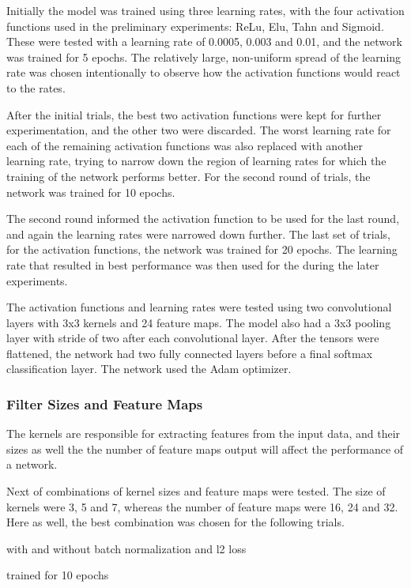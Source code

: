\documentclass[]{article}
\begin{document}
Initially the model was trained using three learning rates, with the four activation functions used in the preliminary experiments: ReLu, Elu, Tahn and Sigmoid. These were tested with a learning rate of 0.0005, 0.003 and 0.01, and the network was trained for 5 epochs. The relatively large, non-uniform spread of the learning rate was chosen intentionally to observe how the activation functions would react to the rates.

After the initial trials, the best two activation functions were kept for further experimentation, and the other two were discarded. The worst learning rate for each of the remaining activation functions was also replaced with another learning rate, trying to narrow down the region of learning rates for which the training of the network performs better. For the second round of trials, the network was trained for 10 epochs. 

The second round informed the activation function to be used for the last round, and again the learning rates were narrowed down further. The last set of trials, for the activation functions, the network was trained for 20 epochs. The learning rate that resulted in best performance was then used for the during the later experiments. 

The activation functions and learning rates were tested using two convolutional layers with 3x3 kernels and 24 feature maps. The model also had a 3x3 pooling layer with stride of two after each convolutional layer. After the tensors were flattened, the network had two fully connected layers before a final softmax classification layer. The network used the Adam optimizer. 

\subsubsection{Filter Sizes and Feature Maps}

The kernels are responsible for extracting features from the input data, and their sizes as well the the number of feature maps output will affect the performance of a network. 

Next of combinations of kernel sizes and feature maps were tested. The size of kernels were 3, 5 and 7, whereas the number of feature maps were 16, 24 and 32. Here as well, the best combination was chosen for the following trials.


with and without batch normalization and l2 loss

trained for 10 epochs
\end{document}
